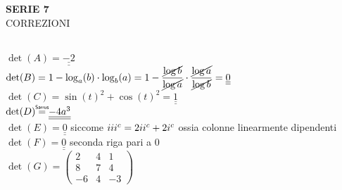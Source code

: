 \documentclass[a4paper,10pt]{article}
\def\doubleu#1{\underline{\underline{#1}}}
\newcommand\df{\displaystyle\frac}
\def\over#1#2{
        \mathrel{
            \overset{
                \makebox[0pt]{
                    \mbox{\normalfont\tiny\sffamily #2}
                }
            }{#1}
        }   
    }
\def\rom#1{\uppercase\expandafter{\romannumeral #1\relax}}
\begin{document}
\pagestyle{plain}


\begin{center}
    \LARGE{\bf SERIE 7}\\
    \large{CORREZIONI}
\end{center}


\smallskip



 \\

    $\det(A)=\doubleu{-2}$\\ 


    $ 
    \det(B)= 1 - \log_{a}(b) \cdot \log_{b}(a) =
    1 - \df{\cancel{\log{b}}}{\cancel{\log{a}}} \cdot 
    \df{\cancel{\log{a}}}{\cancel{\log{b}}} = \doubleu{0}
    $\\


    $ 
    \det(C) = \sin(t)^{2} + \cos(t)^{2} = \doubleu{1}
    $\\


    $ 
    \det(D) \over{=}{Sarrus} \doubleu{-4a^{3}}
    $ \\




    $ 
    \det(E) = \doubleu{0}
    $
      siccome 
    $\rom3^{c} = 2\rom2^{c} + 2\rom1^{c}$
    ossia colonne linearmente dipendenti\\


    $\det(F) = \doubleu{0}$
    seconda riga pari a $0$\\


    $ \det(G) = 
        \begin{pmatrix} 
            2 & 4 & 1 \\
            8 & 7 & 4 \\
            -6 & 4 & -3 
        \end{pmatrix} 
    $
\end{document}
